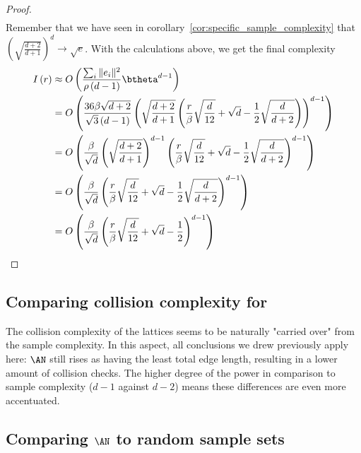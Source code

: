 \begin{proof}
\begin{align*}
    \end{align*}
    Remember that we have seen in corollary~\ref{cor:specific_sample_complexity} that $\left(\sqrt{\frac{d+2}{d+1}}\right)^d\rightarrow\sqrt{e}$. With  the calculations above, we get the final complexity
    \begin{align*}
        I\left(r\right)&\approx O\left(\frac{\sum_i\|e_i\|^2}{\rho\left(d-1\right)}\btheta^{d-1}\right)\\
        &=O\left(\frac{36\beta\sqrt{d+2}}{\sqrt{3}\left(d-1\right)}\left(\sqrt{\frac{d+2}{d+1}}\left(\frac{r}{\beta}\sqrt{\frac{d}{12}}+\sqrt{d}-\frac{1}{2}\sqrt{\frac{d}{d+2}}\right)\right)^{d-1}\right)\\
        &=O\left(\frac{\beta}{\sqrt{d}}\left(\sqrt{\frac{d+2}{d+1}}\right)^{d-1}\left(\frac{r}{\beta}\sqrt{\frac{d}{12}}+\sqrt{d}-\frac{1}{2}\sqrt{\frac{d}{d+2}}\right)^{d-1}\right)\\
        &=O\left(\frac{\beta}{\sqrt{d}}\left(\frac{r}{\beta}\sqrt{\frac{d}{12}}+\sqrt{d}-\frac{1}{2}\sqrt{\frac{d}{d+2}}\right)^{d-1}\right)\\
        &=O\left(\frac{\beta}{\sqrt{d}}\left(\frac{r}{\beta}\sqrt{\frac{d}{12}}+\sqrt{d}-\frac{1}{2}\right)^{d-1}\right)\\
    \end{align*}
\end{proof}
\subsection*{Comparing collision 
complexity for \Lattices}
The collision complexity of the lattices seems to be naturally "carried over" from the sample complexity. In this aspect, all conclusions we drew previously apply here: $\AN$ still rises as having the least total edge length, resulting in a lower amount of collision checks. The higher degree of the power in comparison to sample complexity ($d-1$ against $d-2$) means these differences are even more accentuated. 

\subsection*{Comparing $\AN$ to random sample sets}
 
